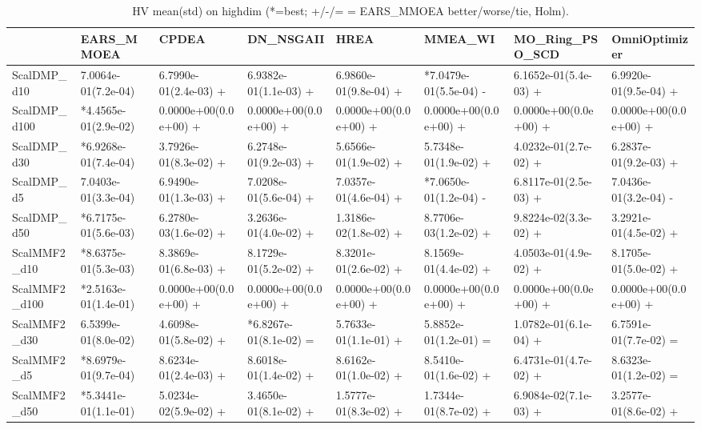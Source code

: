 \begin{table}[t]
\centering
\caption{HV mean(std) on highdim (*=best; +/-/= = EARS_MMOEA better/worse/tie, Holm).}
\label{tab:highdim_HV}
\begin{tabular}{llllllll}
\toprule
 & EARS\_MMOEA & CPDEA & DN\_NSGAII & HREA & MMEA\_WI & MO\_Ring\_PSO\_SCD & OmniOptimizer \\
\midrule
ScalDMP\_d10 & 7.0064e-01(7.2e-04) & 6.7990e-01(2.4e-03) + & 6.9382e-01(1.1e-03) + & 6.9860e-01(9.8e-04) + & *7.0479e-01(5.5e-04) - & 6.1652e-01(5.4e-03) + & 6.9920e-01(9.5e-04) + \\
ScalDMP\_d100 & *4.4565e-01(2.9e-02) & 0.0000e+00(0.0e+00) + & 0.0000e+00(0.0e+00) + & 0.0000e+00(0.0e+00) + & 0.0000e+00(0.0e+00) + & 0.0000e+00(0.0e+00) + & 0.0000e+00(0.0e+00) + \\
ScalDMP\_d30 & *6.9268e-01(7.4e-04) & 3.7926e-01(8.3e-02) + & 6.2748e-01(9.2e-03) + & 5.6566e-01(1.9e-02) + & 5.7348e-01(1.9e-02) + & 4.0232e-01(2.7e-02) + & 6.2837e-01(9.2e-03) + \\
ScalDMP\_d5 & 7.0403e-01(3.3e-04) & 6.9490e-01(1.3e-03) + & 7.0208e-01(5.6e-04) + & 7.0357e-01(4.6e-04) + & *7.0650e-01(1.2e-04) - & 6.8117e-01(2.5e-03) + & 7.0436e-01(3.2e-04) - \\
ScalDMP\_d50 & *6.7175e-01(5.6e-03) & 6.2780e-03(1.6e-02) + & 3.2636e-01(4.0e-02) + & 1.3186e-02(1.8e-02) + & 8.7706e-03(1.2e-02) + & 9.8224e-02(3.3e-02) + & 3.2921e-01(4.5e-02) + \\
ScalMMF2\_d10 & *8.6375e-01(5.3e-03) & 8.3869e-01(6.8e-03) + & 8.1729e-01(5.2e-02) + & 8.3201e-01(2.6e-02) + & 8.1569e-01(4.4e-02) + & 4.0503e-01(4.9e-02) + & 8.1705e-01(5.0e-02) + \\
ScalMMF2\_d100 & *2.5163e-01(1.4e-01) & 0.0000e+00(0.0e+00) + & 0.0000e+00(0.0e+00) + & 0.0000e+00(0.0e+00) + & 0.0000e+00(0.0e+00) + & 0.0000e+00(0.0e+00) + & 0.0000e+00(0.0e+00) + \\
ScalMMF2\_d30 & 6.5399e-01(8.0e-02) & 4.6098e-01(5.8e-02) + & *6.8267e-01(8.1e-02) = & 5.7633e-01(1.1e-01) + & 5.8852e-01(1.2e-01) = & 1.0782e-01(6.1e-04) + & 6.7591e-01(7.7e-02) = \\
ScalMMF2\_d5 & *8.6979e-01(9.7e-04) & 8.6234e-01(2.4e-03) + & 8.6018e-01(1.4e-02) + & 8.6162e-01(1.0e-02) + & 8.5410e-01(1.6e-02) + & 6.4731e-01(4.7e-02) + & 8.6323e-01(1.2e-02) = \\
ScalMMF2\_d50 & *5.3441e-01(1.1e-01) & 5.0234e-02(5.9e-02) + & 3.4650e-01(8.1e-02) + & 1.5777e-01(8.3e-02) + & 1.7344e-01(8.7e-02) + & 6.9084e-02(7.1e-03) + & 3.2577e-01(8.6e-02) + \\
\bottomrule
\end{tabular}
\end{table}
